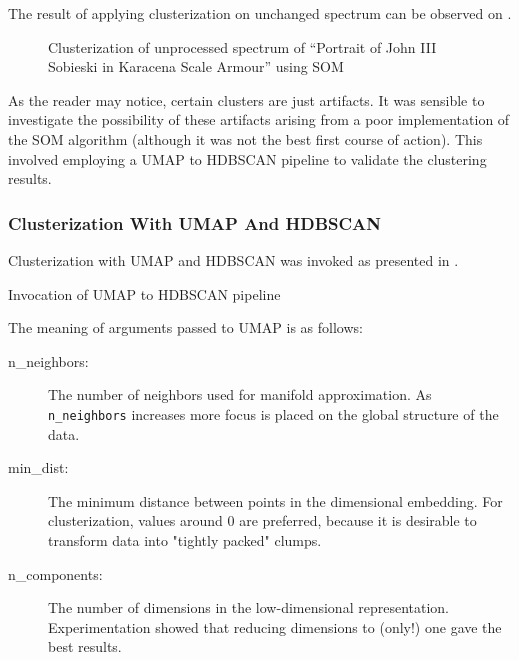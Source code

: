 The result of applying clusterization on unchanged spectrum can be observed on .

\newpage
\begin{figure}[H] 
  \centering     
   
  \caption{Clusterization of unprocessed spectrum of ``Portrait of John III Sobieski in Karacena Scale Armour'' using SOM}
  \label{fig:sobieski_clustered_som_noise}
\end{figure}

As the reader may notice, certain clusters are just artifacts. 
It was sensible to investigate the possibility of these artifacts arising from a poor implementation of the SOM algorithm (although it was not the best first course of action). 
This involved employing a UMAP to HDBSCAN pipeline to validate the clustering results.

\subsubsection{Clusterization With UMAP And HDBSCAN}
Clusterization with UMAP and HDBSCAN was invoked as presented in .

\newenvironment{longlistingH}{\captionsetup{type=listing, width=0.8\textwidth}}{}
\begin{longlistingH}
    \caption{Invocation of UMAP to HDBSCAN pipeline}
    \label{lst:umap-hdbscan-invocation}
\end{longlistingH}
\vspace{12pt}

The meaning of arguments passed to UMAP is as follows:
\begin{description}
    \item[n\_neighbors:] The number of neighbors used for manifold approximation. As \texttt{n\_neighbors} increases more focus is placed on the global structure of the data. 
    \item[min\_dist:] The minimum distance between points in the dimensional embedding. For clusterization, values around 0 are preferred, because it is desirable to transform data into "tightly packed" clumps.
    \item[n\_components:] The number of dimensions in the low-dimensional representation. Experimentation showed that reducing dimensions to (only!) one gave the best results. 
\end{description}

